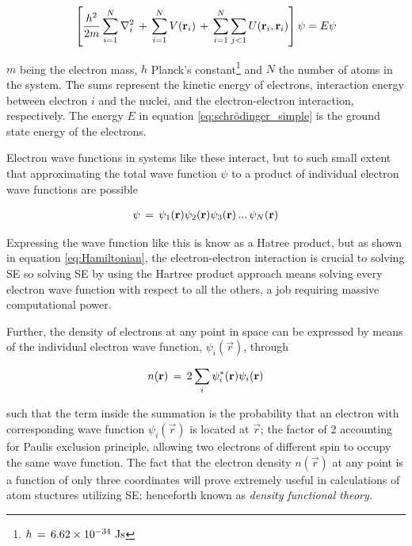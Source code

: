 {\begin{align}
\left[ \dfrac{h^2}{2m}\sum_{i=1}^{N}\nabla^2_i\,+\, \sum_{i=1}^{N}V(\textbf{r}_i) \,+\, \sum_{i=1}^{N}\sum_{j<1}U(\textbf{r}_i,\textbf{r}_i) \right] \psi = E\psi
	\label{eq:many_particle_SE}
\end{align}

$m$ being the electron mass, $h$ Planck's constant\footnote{$h\,=\,6.62\times10^{-34}\text{ Js}$} and $N$ the number of atoms in the system. The sums represent the kinetic energy of electrons, interaction energy between electron $i$ and the nuclei, and the electron-electron interaction, respectively. The energy $E$ in equation \ref{eq:schrödinger_simple} is the ground state energy of the electrons.

Electron wave functions in systems like these interact, but to such small extent that approximating the total wave function $\psi$ to a product of individual electron wave functions are possible

\begin{align}
\psi\,=\, \psi_1(\textbf{r})\psi_2(\textbf{r})\psi_3(\textbf{r}) \,...\, \psi_N(\textbf{r})
\end{align}

Expressing the wave function like this is know as a Hatree product, but as shown in equation \ref{eq:Hamiltonian}, the electron-electron interaction is crucial to solving SE so solving SE by using the Hartree product approach means solving every electron wave function with respect to all the others, a job requiring massive computational power.

Further, the density of electrons at any point in space can be expressed by means of the individual electron wave function, $\psi_i(\vec{r})$, through 

\begin{align}
n(\textbf{r})\,=\, 2 \sum_i \psi_i^*(\textbf{r})\psi_i(\textbf{r})
\label{eq:electron_density}
\end{align}

such that the term inside the summation is the probability that an electron with corresponding wave function $\psi_i(\vec{r})$ is located at $\vec{r}$; the factor of 2 accounting for Paulis exclusion principle, allowing two electrons of different spin to occupy the same wave function. The fact that the electron density $n(\vec{r})$ at any point is a function of only three coordinates will prove extremely useful in calculations of atom stuctures utilizing SE; henceforth known as \textit{density functional theory.}


}
